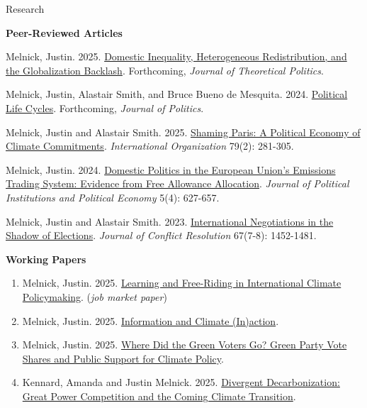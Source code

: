 \documentclass{resume} %
\begin{document}
\begin{rSection}{Research}

\textbf{Peer-Reviewed Articles}
\begin{etaremune}
            \item Melnick, Justin. 2025. \href{https://justinmelnick.github.io/papers/exit/paper.pdf}{Domestic Inequality, Heterogeneous Redistribution, and the Globalization Backlash}. Forthcoming, \textit{Journal of Theoretical Politics}.
 \item Melnick, Justin, Alastair Smith, and Bruce Bueno de Mesquita. 2024. \href{https://justinmelnick.github.io/papers/plc/paper.pdf}{Political Life Cycles}. Forthcoming, \textit{Journal of Politics}.
            \item Melnick, Justin and Alastair Smith. 2025. \href{https://justinmelnick.github.io/papers/paris/paper.pdf}{Shaming Paris: A Political Economy of Climate Commitments}. \textit{International Organization} 79(2): 281-305.
\item Melnick, Justin. 2024. \href{https://justinmelnick.github.io/papers/ets/paper.pdf}{Domestic Politics in the European Union’s Emissions Trading System: Evidence from Free Allowance Allocation}. \textit{Journal of Political Institutions and Political Economy} 5(4): 627-657.
    \item Melnick, Justin and Alastair Smith. 2023. \href{https://justinmelnick.github.io/papers/nego/paper.pdf}{International Negotiations in the Shadow of Elections}.  \textit{Journal of Conflict Resolution} 67(7-8): 1452-1481.
\end{etaremune}

\textbf{Working Papers}
\begin{enumerate}
 \item Melnick, Justin. 2025. \href{https://justinmelnick.github.io/papers/complementarities/paper.pdf}{Learning and Free-Riding in International Climate Policymaking}. (\textit{job market paper})
                    \item Melnick, Justin. 2025. \href{https://justinmelnick.github.io/papers/inaction/paper.pdf}{Information and Climate (In)action}.
                        \item Melnick, Justin. 2025. \href{https://justinmelnick.github.io/papers/greens/paper.pdf}{Where Did the Green Voters Go? Green Party Vote Shares and Public Support for Climate Policy}.
                        \item Kennard, Amanda and Justin Melnick. 2025. \href{https://justinmelnick.github.io/papers/future/paper.pdf}{Divergent Decarbonization: Great Power Competition and the Coming Climate Transition}. 
\end{enumerate}


\end{rSection}
\end{document}
